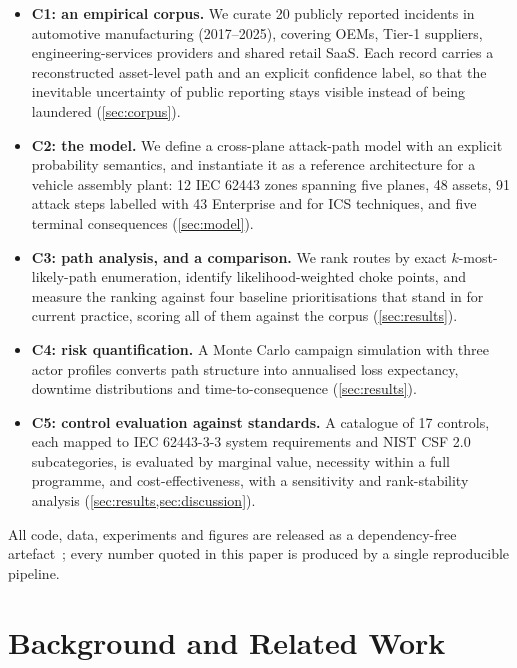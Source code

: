 \begin{itemize}
  \item \textbf{C1: an empirical corpus.} We curate 20 publicly reported
    incidents in automotive manufacturing (2017--2025), covering OEMs, Tier-1
    suppliers, engineering-services providers and shared retail SaaS. Each
    record carries a reconstructed asset-level path and an explicit confidence
    label, so that the inevitable uncertainty of public reporting stays visible
    instead of being laundered (\cref{sec:corpus}).
  \item \textbf{C2: the \capm{} model.} We define a cross-plane attack-path
    model with an explicit probability semantics, and instantiate it as a
    reference architecture for a vehicle assembly plant: 12 IEC 62443 zones
    spanning five planes, 48 assets, 91 attack steps labelled with 43 \attck{}
    Enterprise and \attck{} for ICS techniques, and five terminal consequences
    (\cref{sec:model}).
  \item \textbf{C3: path analysis, and a comparison.} We rank routes by exact
    $k$-most-likely-path enumeration, identify likelihood-weighted choke points,
    and measure the ranking against four baseline prioritisations that stand in
    for current practice, scoring all of them against the corpus
    (\cref{sec:results}).
  \item \textbf{C4: risk quantification.} A Monte Carlo campaign simulation
    with three actor profiles converts path structure into annualised loss
    expectancy, downtime distributions and time-to-consequence
    (\cref{sec:results}).
  \item \textbf{C5: control evaluation against standards.} A catalogue of 17
    controls, each mapped to IEC 62443-3-3 system requirements and NIST CSF 2.0
    subcategories, is evaluated by marginal value, necessity within a full
    programme, and cost-effectiveness, with a sensitivity and rank-stability
    analysis (\cref{sec:results,sec:discussion}).
\end{itemize}

All code, data, experiments and figures are released as a dependency-free
artefact~\cite{capmartifact}; every number quoted in this paper is produced by
a single reproducible pipeline.

\section{Background and Related Work}
\label{sec:background}

